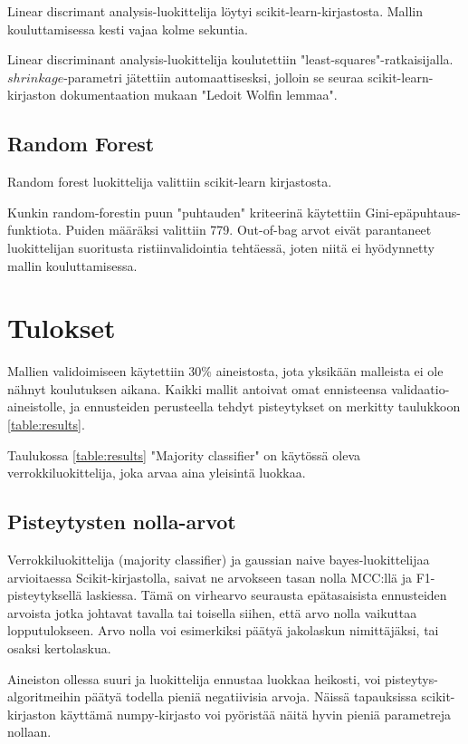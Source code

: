 \documentclass[finnish,twoside,openright]{HYgraduMLDS}
\begin{document}
Linear discrimant analysis-luokittelija löytyi scikit-learn-kirjastosta\cite{scikit-learn}. Mallin kouluttamisessa kesti vajaa kolme sekuntia.

Linear discriminant analysis-luokittelija koulutettiin "least-squares"-ratkaisijalla. $shrinkage$-parametri jätettiin automaattisesksi, jolloin se seuraa scikit-learn-kirjaston dokumentaation mukaan "Ledoit Wolfin lemmaa".

\subsection{Random Forest}

Random forest luokittelija valittiin scikit-learn\cite{scikit-learn} kirjastosta. 

Kunkin random-forestin puun "puhtauden" kriteerinä käytettiin Gini-epäpuhtaus-funktiota. Puiden määräksi valittiin 779. Out-of-bag arvot eivät parantaneet luokittelijan suoritusta ristiinvalidointia tehtäessä, joten niitä ei hyödynnetty mallin kouluttamisessa.


\section{Tulokset}

Mallien validoimiseen käytettiin 30\% aineistosta, jota yksikään malleista ei ole nähnyt koulutuksen aikana. Kaikki mallit antoivat omat ennisteensa validaatio-aineistolle, ja ennusteiden perusteella tehdyt pisteytykset on merkitty taulukkoon \ref{table:results}.

Taulukossa \ref{table:results} "Majority classifier" on käytössä oleva verrokkiluokittelija, joka arvaa aina yleisintä luokkaa. 


\subsection{Pisteytysten nolla-arvot}

Verrokkiluokittelija (majority classifier) ja gaussian naive bayes-luokittelijaa arvioitaessa Scikit-kirjastolla\cite{scikit-learn}, saivat ne arvokseen tasan nolla MCC:llä ja F1-pisteytyksellä laskiessa. Tämä on virhearvo seurausta epätasaisista ennusteiden arvoista jotka johtavat tavalla tai toisella siihen, että arvo nolla vaikuttaa lopputulokseen. Arvo nolla voi esimerkiksi päätyä jakolaskun nimittäjäksi, tai osaksi kertolaskua.

Aineiston ollessa suuri ja luokittelija ennustaa luokkaa heikosti, voi pisteytys-algoritmeihin päätyä todella pieniä negatiivisia arvoja. Näissä tapauksissa scikit-kirjaston\cite{scikit-learn} käyttämä numpy-kirjasto\cite{oliphant2006guide} voi pyöristää näitä hyvin pieniä parametreja nollaan.
\end{document}

